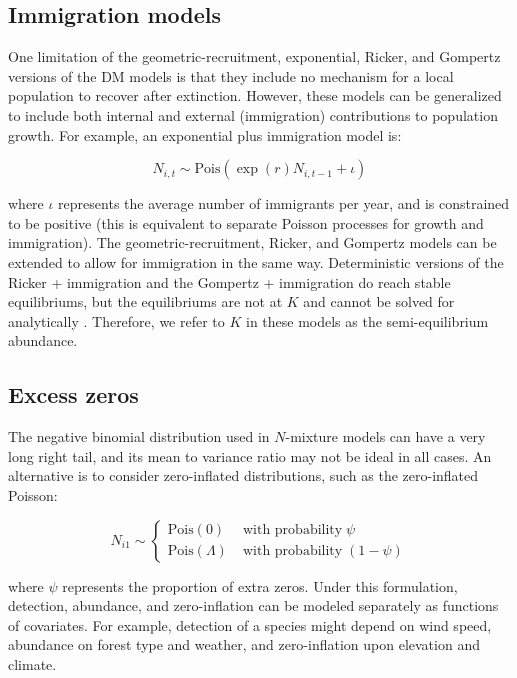 \documentclass[12pt,english]{article}
\begin{document}
\begin{spacing}{1.9}
\begin{flushleft}
\subsection*{Immigration models}

One limitation of the geometric-recruitment, exponential,
Ricker, and Gompertz versions of the DM models 
is that they include no mechanism for a local population to recover
after extinction. 
However, these models can be generalized 
to include both internal and external (immigration) contributions
to population growth. For example, an exponential plus immigration
model is:
\begin{linenomath*}
\begin{equation}
  N_{i,t} \sim \mathrm{Pois}(\exp(r)N_{i,t-1} + \iota)
  \label{eq:expimm2}
\end{equation}
\end{linenomath*}
where $\iota$ represents the average number of immigrants per year, and is
constrained to be
positive (this is equivalent to separate Poisson processes for
growth and immigration).  
The geometric-recruitment, Ricker,
and Gompertz models can be extended to allow for immigration in the
same way.   Deterministic versions of the Ricker + immigration and the 
Gompertz + immigration do reach stable equilibriums, but the equilibriums 
are not at $K$ and cannot be solved for analytically \citep{otto_day:2007}.  Therefore, we
refer to $K$ in these models as the semi-equilibrium abundance.

\subsection*{Excess zeros}

The negative binomial distribution used in $N$-mixture models can have
a very long right tail, and its mean to variance ratio may not be
ideal in all cases. An alternative is to consider zero-inflated
distributions, such as the zero-inflated Poisson:
\begin{linenomath*}
\begin{equation}
N_{i1} \sim \left\{
\begin{aligned}
\mbox{Pois}(0) &\; \text{with probability} \; \psi \\
\mbox{Pois}(\Lambda) &\; \text{with probability} \; (1-\psi)
\end{aligned} \right.
\label{eq:ZIP}
\end{equation}
\end{linenomath*}
where $\psi$ represents the proportion of extra zeros. 
Under this formulation, 
detection, abundance, and zero-inflation can be modeled separately as
functions of covariates. For example, detection of a
species might depend on wind speed,
abundance on forest type and weather, and zero-inflation upon elevation and
climate.  


\end{flushleft}
\end{spacing}
\end{document}
